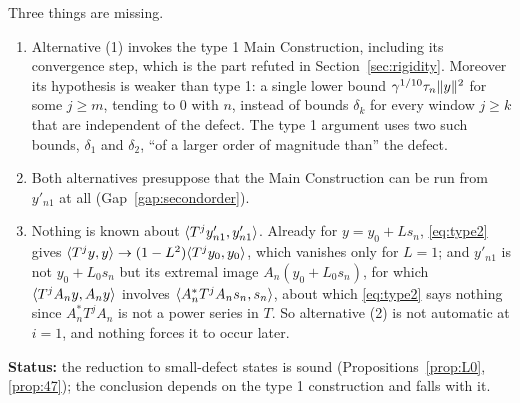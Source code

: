 \begin{gap}\label{gap:type2}
Three things are missing.
\begin{enumerate}[label=(\alph*)]
\item Alternative (1) invokes the type 1 Main Construction, including its convergence step,
which is the part refuted in Section~\ref{sec:rigidity}. Moreover its hypothesis is weaker
than type 1: a single lower bound $\gamma^{1/10}\tau_n\lVert y\rVert^2$ for some $j\ge m$, tending to
$0$ with $n$, instead of bounds $\delta_k$ for every window $j\ge k$ that are independent of
the defect. The type 1 argument uses two such bounds, $\delta_1$ and $\delta_2$, ``of a larger
order of magnitude than'' the defect.
\item Both alternatives presuppose that the Main Construction can be run from $y'_{n1}$ at
all (Gap~\ref{gap:secondorder}).
\item Nothing is known about $\langle T^jy'_{n1},y'_{n1}\rangle$. Already for $y=y_0+Ls_n$,
\eqref{eq:type2} gives $\langle T^jy,y\rangle\to(1-L^2)\langle T^jy_0,y_0\rangle$, which vanishes only for $L=1$;
and $y'_{n1}$ is not $y_0+L_0s_n$ but its extremal image $A_n(y_0+L_0s_n)$, for which
$\langle T^jA_ny,A_ny\rangle$ involves $\langle A_n^*T^jA_ns_n,s_n\rangle$, about which \eqref{eq:type2} says
nothing since $A_n^*T^jA_n$ is not a power series in $T$. So alternative (2) is not automatic
at $i=1$, and nothing forces it to occur later.
\end{enumerate}
\textbf{Status:} the reduction to small-defect states is sound
(Propositions~\ref{prop:L0}, \ref{prop:47}); the conclusion depends on the type 1 construction
and falls with it.
\end{gap}
